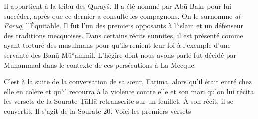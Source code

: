 
Il appartient à la tribu des Qurayš. Il a été nommé par Abū Bakr pour
lui succéder, après que ce dernier a consulté les compagnons. On le
surnomme \emph{al-Fārūq}, l'Équitable. Il fut l'un des premiers
opposants à l'islam et un défenseur des traditions mecquoises. Dans
certains récits sunnites, il est présenté comme ayant torturé des
musulmans pour qu'ils renient leur foi à l'exemple d'une servante des
Banū Mūʾammil. L'hégire dont nous avons parlé fut décidé par Muḥammad
dans le contexte de ces persécutions à La Mecque.

C'est à la suite de la conversation de sa sœur, Fāṭima, alors qu'il
était entré chez elle en colère et qu'il recourra à la violence contre
elle et son mari qu'on lui récita les versets de la Sourate ṬāHā
retranscrite sur un feuillet. À son récit, il se convertit. Il s'agit de
la Sourate 20. Voici les premiers versets


